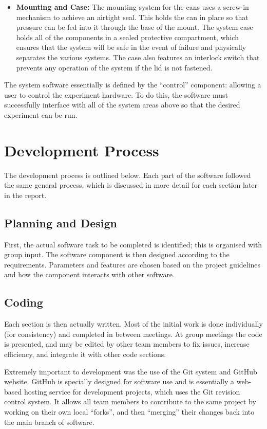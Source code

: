 \begin{itemize}
	\item {\bf Mounting and Case:} The mounting system for the cans uses a screw-in mechanism to achieve an airtight seal. This holds the can in place so that pressure can be fed into it through the base of the mount. The system case holds all of the components in a sealed protective compartment, which ensures that the system will be safe in the event of failure and physically separates the various systems. The case also features an interlock switch that prevents any operation of the system if the lid is not fastened.

\end{itemize}

The system software essentially is defined by the “control” component: allowing a user to control the experiment hardware. To do this, the software must successfully interface with all of the system areas above so that the desired experiment can be run. 

\section{Development Process}

The development process is outlined below. Each part of the software followed the same general process, which is discussed in more detail for each section later in the report.

\subsection{Planning and Design}
First, the actual software task to be completed is identified; this is organised with group input. The software component is then designed according to the requirements. Parameters and features are chosen based on the project guidelines and how the component interacts with other software. 

\subsection{Coding}

Each section is then actually written. Most of the initial work is done individually (for consistency) and completed in between meetings. At group meetings the code is presented, and may be edited by other team members to fix issues, increase efficiency, and integrate it with other code sections.


Extremely important to development was the use of the Git system\cite{github,gitucc} and GitHub website\cite{github}. GitHub is specially designed for software use and is essentially a web-based hosting service for development projects, which uses the Git revision control system. It allows all team members to contribute to the same project by working on their own local ``forks'', and then ``merging'' their changes back into the main branch of software\cite{github_fork}.

